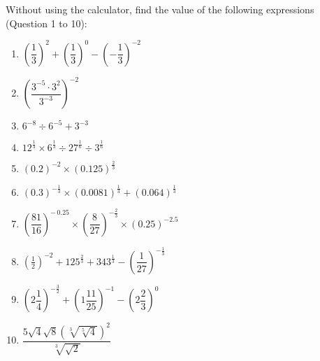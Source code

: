 \documentclass[12pt]{report}
\begin{document}
\begin{multicols}{2}
  Without using the calculator, find the value of the following expressions (Question 1 to 10):
  \begin{enumerate}
    \item $\left(\dfrac{1}{3}\right)^2 + \left(\dfrac{1}{3}\right)^0 - \left(-\dfrac{1}{3}\right)^{-2}$
    \item $\left(\dfrac{3^{-5}\cdot3^{2}}{3^{-3}}\right)^{-2}$
    \item $6^{-8} \div 6^{-5} + 3^{-3}$
    \item $12^{\frac{1}{3}} \times 6^{\frac{1}{3}} \div 27^{\frac{1}{6}} \div 3^{\frac{1}{6}}$
    \item $(0.2)^{-2}\times (0.125)^{\frac{2}{3}}$
    \item $(0.3)^{-\frac{1}{3}}\times(0.0081)^{\frac{1}{3}}+(0.064)^{\frac{1}{3}}$
    \item $\left(\dfrac{81}{16}\right)^{-\,0.25}\times\left(\dfrac{8}{27}\right)^{-\frac{2}{3}}\times(0.25)^{-2.5}$
    \item $\left(\frac{1}{2}\right)^{-2}+125^{\frac{2}{3}}+343^{\frac{1}{3}}-\left(\dfrac{1}{27}\right)^{-\frac{1}{3}}$
    \item $\left(2{\dfrac{1}{4}}\right)^{-{\frac{3}{2}}}+\left(1{\dfrac{11}{25}}\right)^{-1}-\left(2{\dfrac{2}{3}}\right)^{0}$
    \item $\dfrac{5\sqrt{4}\sqrt{8}\left({\sqrt[3]{\sqrt[5]{4}}}\right)^{2}}{\sqrt[3]{\sqrt{2}}}$
  \end{enumerate}


\end{multicols}
\end{document}
